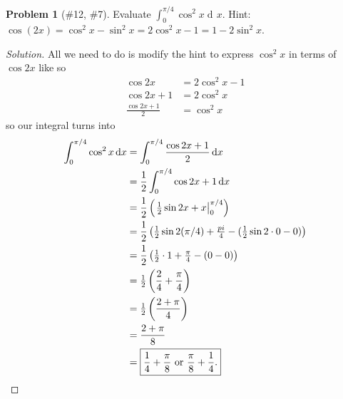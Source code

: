 \documentclass{article}
\theoremstyle{plain}
\theoremstyle{definition}
\newtheorem{problem}[exercise]{Problem}
\theoremstyle{remark}
\DeclareMathOperator{\diff}{d\!}
\begin{document}
\begin{problem}[{\color{Green}\#12}, {\color{Red}\#7}]
Evaluate $\int_0^{\pi/4}\cos^2x\diff x$. Hint:
$\cos(2x)=\cos^2x-\sin^2x=2\cos^2x-1=1-2\sin^2x$.
\end{problem}
\begin{proof}[Solution]
All we need to do is modify the hint to express $\cos^2 x$ in terms of
$\cos 2x$ like so
\begin{align*}
\cos 2x&=2\cos^2 x-1\\
\cos 2x+1&=2\cos^2 x\\
\frac{\cos 2x+1}{2}&=\cos^2x
\end{align*}
so our integral turns into
\begin{align*}
\int_0^{\pi/4}\cos^2 x\diff x
&=\int_0^{\pi/4}\frac{\cos 2x+1}{2}\diff x\\
&=\frac{1}{2}\int_0^{\pi/4}\cos 2x+1\diff x\\
&=\frac{1}{2}\left(\left.\tfrac{1}{2}\sin 2x+x\right|_0^{\pi/4}\right)\\
&=\frac{1}{2}\left(\tfrac{1}{2}\sin 2(\pi/4)+\tfrac{pi}{4}-(\tfrac{1}{2}\sin 2\cdot
  0-0)\right)\\
&=\frac{1}{2}\left(\tfrac{1}{2}\cdot 1+\tfrac{\pi}{4}-(0-0)\right)\\
&=\tfrac{1}{2}\left(\frac{2}{4}+\frac{\pi}{4}\right)\\
&=\tfrac{1}{2}\left(\frac{2+\pi}{4}\right)\\
&=\frac{2+\pi}{8}\\
&=\boxed{\frac{1}{4}+\frac{\pi}{8}\text{ or }\frac{\pi}{8}+\frac{1}{4}.}\qedhere
\end{align*}
\end{proof}
\end{document}
